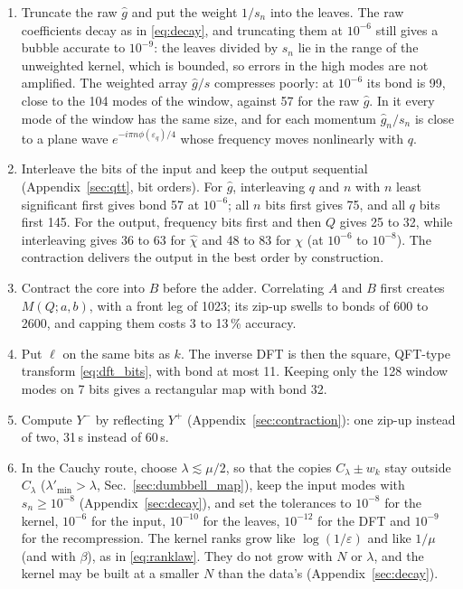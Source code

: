 \documentclass[aps,prb,reprint,a4paper]{revtex4-2}
\begin{document}
\begin{enumerate}
  \item Truncate the raw $\hat g$ and put the weight $1/s_n$ into the leaves. The raw coefficients decay as in \eqref{eq:decay}, and truncating them at $10^{-6}$ still gives a bubble accurate to $10^{-9}$: the leaves divided by $s_n$ lie in the range of the unweighted kernel, which is bounded, so errors in the high modes are not amplified. The weighted array $\hat g/s$ compresses poorly: at $10^{-6}$ its bond is 99, close to the 104 modes of the window, against 57 for the raw $\hat g$. In it every mode of the window has the same size, and for each momentum $\hat g_n/s_n$ is close to a plane wave $e^{-i\pi n\phi(\varepsilon_q)/4}$ whose frequency moves nonlinearly with $q$.
  \item Interleave the bits of the input and keep the output sequential (Appendix~\ref{sec:qtt}, bit orders). For $\hat g$, interleaving $q$ and $n$ with $n$ least significant first gives bond 57 at $10^{-6}$; all $n$ bits first gives 75, and all $q$ bits first 145. For the output, frequency bits first and then $Q$ gives 25 to 32, while interleaving gives 36 to 63 for $\hat\chi$ and 48 to 83 for $\chi$ (at $10^{-6}$ to $10^{-8}$). The contraction delivers the output in the best order by construction.
  \item Contract the core into $B$ before the adder. Correlating $A$ and $B$ first creates $M(Q;a,b)$, with a front leg of 1023; its zip-up swells to bonds of 600 to 2600, and capping them costs 3 to 13\,\% accuracy.
  \item Put $\ell$ on the same bits as $k$. The inverse DFT is then the square, QFT-type transform \eqref{eq:dft_bits}, with bond at most 11. Keeping only the 128 window modes on 7 bits gives a rectangular map with bond 32.
  \item Compute $Y^-$ by reflecting $Y^+$ (Appendix~\ref{sec:contraction}): one zip-up instead of two, 31\,s instead of 60\,s.
  \item In the Cauchy route, choose $\lambda\lesssim\mu/2$, so that the copies $C_\lambda\pm w_k$ stay outside $C_\lambda$ ($\lambda'_{\min}>\lambda$, Sec.~\ref{sec:dumbbell_map}), keep the input modes with $s_n\ge10^{-8}$ (Appendix~\ref{sec:decay}), and set the tolerances to $10^{-8}$ for the kernel, $10^{-6}$ for the input, $10^{-10}$ for the leaves, $10^{-12}$ for the DFT and $10^{-9}$ for the recompression. The kernel ranks grow like $\log(1/\varepsilon)$ and like $1/\mu$ (and with $\beta$), as in \eqref{eq:ranklaw}. They do not grow with $N$ or $\lambda$, and the kernel may be built at a smaller $N$ than the data's (Appendix~\ref{sec:decay}).

\end{enumerate}
\end{document}

